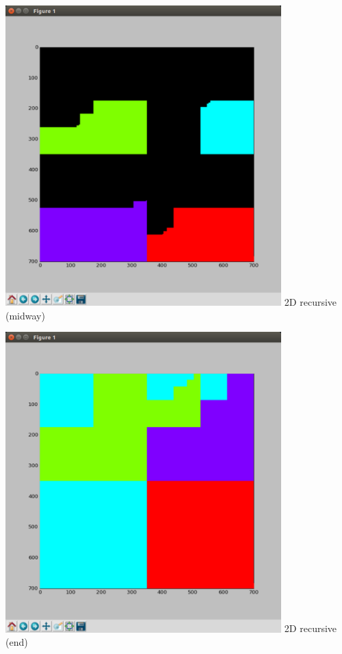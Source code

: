 \documentclass[12pt,dvipdfmx]{beamer}
\begin{document}
\begin{frame}
\begin{center}
\begin{columns}
  \begin{column}{0.3\textwidth}
\includegraphics[width=0.8\textwidth]{out/pdf/img/load_balance_rec.pdf}
\vskip-2mm
{\footnotesize 2D recursive (midway)}

\vskip3mm
    
\includegraphics[width=0.8\textwidth]{out/pdf/img/load_balance_rec_end.pdf}
\vskip-2mm
{\footnotesize 2D recursive (end)}
  \end{column}

\end{columns}
\end{center}
\end{frame}
\end{document}

